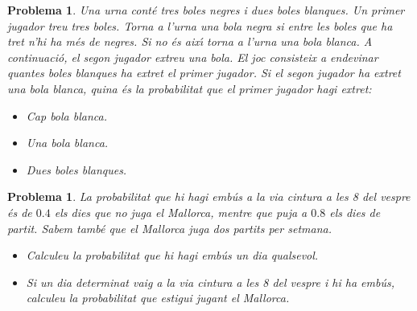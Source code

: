 \documentclass[11pt]{article}
\newcounter{prbcont}
\newtheorem{problema}[prbcont]{Problema}
\begin{document}
\begin{problema}
Una urna cont\'e tres boles negres i dues boles blanques. Un primer jugador treu tres boles.
Torna a l'urna una bola negra si entre les boles que ha tret n'hi ha m\'es de negres. Si no
\'es aix\'{\i} torna a l'urna una bola blanca. A continuaci\'o, el segon jugador extreu una bola.
El joc consisteix a endevinar quantes boles blanques ha extret el primer jugador. Si el
segon jugador ha extret una bola blanca, quina \'es la probabilitat que el primer jugador
hagi extret:
\begin{itemize}
\item [(a)] Cap bola blanca.
\item [(b)] Una bola blanca.
\item [(c)] Dues boles blanques.
\end{itemize}
\end{problema}

\begin{problema}
La probabilitat que hi hagi emb\'us a la via cintura a les 8 del vespre \'es de $0.4$ els dies que no
juga el Mallorca, mentre que puja a $0.8$ els dies de partit. Sabem tamb\'e que el Mallorca juga
dos partits per setmana.
\begin{itemize}
\item [(a)] Calculeu la probabilitat que hi hagi emb\'us un dia qualsevol.
\item [(b)] Si un dia determinat vaig a la via cintura a les 8 del vespre i hi ha emb\'us, calculeu la
probabilitat que estigui jugant el Mallorca.
\end{itemize}
\end{problema}
\end{document}
